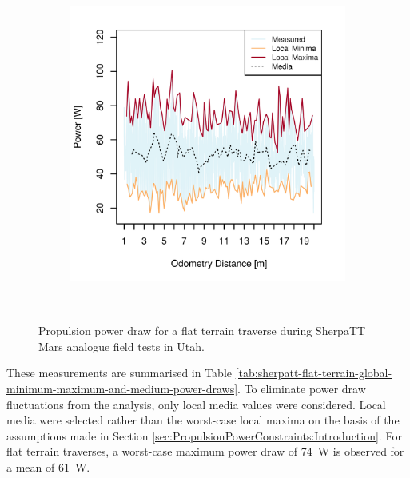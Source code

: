 \begin{figure}[h]
\begin{subfigure}[t]{\subfigureWidth}
        \includegraphics[height=\graphicsHeight]{sections/locomotion-power-draws/plots/locomotion-power-draw-on-flat-terrain-2.png}
		\label{fig:plot:sub:sherpatt-flat-terrain-power-draw-2}
	\end{subfigure}\\[0.8ex]
    \caption[Propulsion power draw for a flat terrain traverse during SherpaTT Mars analogue field tests in Utah]
            {Propulsion power draw for a flat terrain traverse during SherpaTT Mars analogue field tests in Utah.}
    \label{fig:plot:sherpatt-flat-terrain-power-draw}
\vspace{-2ex}
\end{figure}


These measurements are summarised in Table \ref{tab:sherpatt-flat-terrain-global-minimum-maximum-and-medium-power-draws}. To eliminate power draw fluctuations from the analysis, only local media values were considered. Local media were selected rather than the worst-case local maxima on the basis of the assumptions made in Section \ref{sec:PropulsionPowerConstraints:Introduction}. For flat terrain traverses, a worst-case maximum power draw of \SI{74}{\watt} is observed for a mean of \SI{61}{\watt}.

\clearpage


